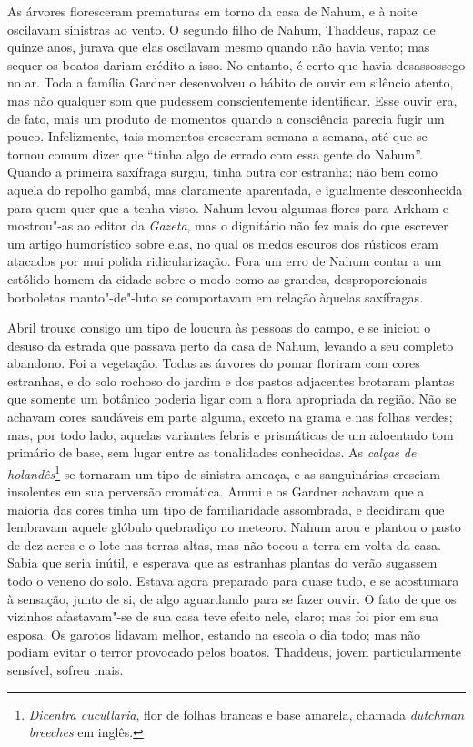 As árvores floresceram prematuras em torno da casa de Nahum, e à noite
oscilavam sinistras ao vento. O segundo filho de Nahum, Thaddeus, rapaz
de quinze anos, jurava que elas oscilavam mesmo quando não havia vento;
mas sequer os boatos dariam crédito a isso. No entanto, é certo que
havia desassossego no ar. Toda a família Gardner desenvolveu o hábito de
ouvir em silêncio atento, mas não qualquer som que pudessem
conscientemente identificar. Esse ouvir era, de fato, mais um produto de
momentos quando a consciência parecia fugir um pouco. Infelizmente, tais
momentos cresceram semana a semana, até que se tornou comum dizer que
``tinha algo de errado com essa gente do Nahum''. Quando a primeira
saxífraga surgiu, tinha outra cor estranha; não bem como aquela do
repolho gambá, mas claramente aparentada, e igualmente desconhecida para
quem quer que a tenha visto. Nahum levou algumas flores para Arkham e
mostrou"-as ao editor da \textit{Gazeta}, mas o dignitário não fez mais do
que escrever um artigo humorístico sobre elas, no qual os medos escuros
dos rústicos eram atacados por mui polida ridicularização. Fora um erro
de Nahum contar a um estólido homem da cidade sobre o modo como as
grandes, desproporcionais borboletas manto"-de"-luto se comportavam em
relação àquelas saxífragas.

Abril trouxe consigo um tipo de loucura às pessoas do campo, e se
iniciou o desuso da estrada que passava perto da casa de Nahum, levando
a seu completo abandono. Foi a vegetação. Todas as árvores do pomar
floriram com cores estranhas, e do solo rochoso do jardim e dos pastos
adjacentes brotaram plantas que somente um botânico poderia ligar com a
flora apropriada da região. Não se achavam cores saudáveis em parte
alguma, exceto na grama e nas folhas verdes; mas, por todo lado, aquelas
variantes febris e prismáticas de um adoentado tom primário de base, sem
lugar entre as tonalidades conhecidas. As \textit{calças de
holandês}\footnote{\textit{Dicentra cucullaria}, flor de folhas brancas e
  base amarela, chamada \textit{dutchman breeches} em inglês.} se tornaram
um tipo de sinistra ameaça, e as sanguinárias cresciam insolentes em sua
perversão cromática. Ammi e os Gardner achavam que a maioria das cores
tinha um tipo de familiaridade assombrada, e decidiram que lembravam
aquele glóbulo quebradiço no meteoro. Nahum arou e plantou o pasto de
dez acres e o lote nas terras altas, mas não tocou a terra em volta da
casa. Sabia que seria inútil, e esperava que as estranhas plantas do
verão sugassem todo o veneno do solo. Estava agora preparado para quase
tudo, e se acostumara à sensação, junto de si, de algo aguardando para
se fazer ouvir. O fato de que os vizinhos afastavam"-se de sua casa teve
efeito nele, claro; mas foi pior em sua esposa. Os garotos lidavam
melhor, estando na escola o dia todo; mas não podiam evitar o terror
provocado pelos boatos. Thaddeus, jovem particularmente sensível, sofreu
mais.

